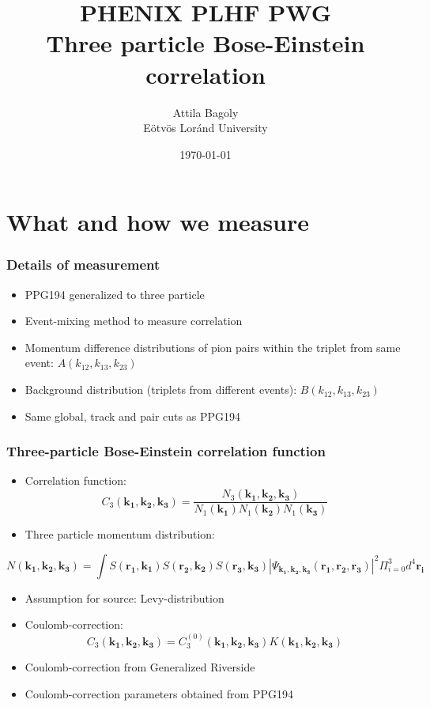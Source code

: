 \documentclass{beamer}
\title[Three particle Levy HBT]{\Large{PHENIX PLHF PWG}\\Three particle Bose-Einstein correlation}
\author[Attila Bagoly]{Attila Bagoly\\ Eötvös Loránd University \vspace{0.5cm}}
\date[\today]{\today}
\institute[ELTE]{
\large{Supervisor: Máté Csanád}
}
\begin{document}
\begin{frame}
  \titlepage
\end{frame}


\section{What and how we measure}
\begin{frame}
\frametitle{Details of measurement}
\begin{itemize}
\setlength{\itemsep}{22pt}
\item PPG194 generalized to three particle
\item Event-mixing method to measure correlation
\item Momentum difference distributions of pion pairs within the triplet from same event: $A(k_{12}, k_{13}, k_{23})$
\item Background distribution (triplets from different events): $B(k_{12}, k_{13}, k_{23})$
\item Same global, track and pair cuts as PPG194
\end{itemize}
\end{frame}

\begin{frame}
\frametitle{Three-particle Bose-Einstein correlation function}
\begin{itemize}
\setlength{\itemsep}{18pt}
\item Correlation function:
\begin{equation}
C_3(\bm{k_1}, \bm{k_2}, \bm{k_3})=\frac{N_3(\bm{k_1}, \bm{k_2}, \bm{k_3})}{N_1(\bm{k_1})N_1(\bm{k_2})N_1(\bm{k_3})}
\end{equation}
\item Three particle momentum distribution:
\end{itemize}
\begin{equation}
N(\bm{k_1}, \bm{k_2}, \bm{k_3}) = \int S(\bm{r_1}, \bm{k_1})S(\bm{r_2}, \bm{k_2})S(\bm{r_3}, \bm{k_3})|\Psi_{\bm{k_1, k_2, k_3}}(\bm{r_1},\bm{r_2},\bm{r_3})|^2 \Pi_{i=0}^{3} d^4 \bm{r_i}
\end{equation}
\begin{itemize}
\setlength{\itemsep}{18pt}
\item Assumption for source: Levy-distribution

\item Coulomb-correction:
\begin{equation}
C_3(\bm{k_1}, \bm{k_2}, \bm{k_3}) = C_3^{(0)}(\bm{k_1}, \bm{k_2}, \bm{k_3})K(\bm{k_1}, \bm{k_2}, \bm{k_3})
\end{equation}
\item Coulomb-correction from Generalized Riverside
\item Coulomb-correction parameters obtained from PPG194
\end{itemize}
\end{frame}
\end{document}
